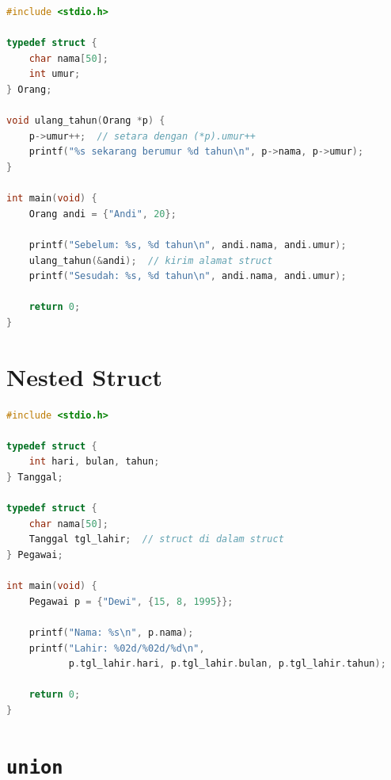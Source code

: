 \documentclass[../main.tex]{subfiles}
\begin{document}
\begin{lstlisting}[language=C,caption=Pointer ke struct dan operator \texttt{->}]
#include <stdio.h>

typedef struct {
    char nama[50];
    int umur;
} Orang;

void ulang_tahun(Orang *p) {
    p->umur++;  // setara dengan (*p).umur++
    printf("%s sekarang berumur %d tahun\n", p->nama, p->umur);
}

int main(void) {
    Orang andi = {"Andi", 20};
    
    printf("Sebelum: %s, %d tahun\n", andi.nama, andi.umur);
    ulang_tahun(&andi);  // kirim alamat struct
    printf("Sesudah: %s, %d tahun\n", andi.nama, andi.umur);
    
    return 0;
}
\end{lstlisting}



\section{Nested Struct}

\begin{lstlisting}[language=C,caption=Struct di dalam struct]
#include <stdio.h>

typedef struct {
    int hari, bulan, tahun;
} Tanggal;

typedef struct {
    char nama[50];
    Tanggal tgl_lahir;  // struct di dalam struct
} Pegawai;

int main(void) {
    Pegawai p = {"Dewi", {15, 8, 1995}};
    
    printf("Nama: %s\n", p.nama);
    printf("Lahir: %02d/%02d/%d\n",
           p.tgl_lahir.hari, p.tgl_lahir.bulan, p.tgl_lahir.tahun);
    
    return 0;
}
\end{lstlisting}

\section{\texttt{union}}
\end{document}
